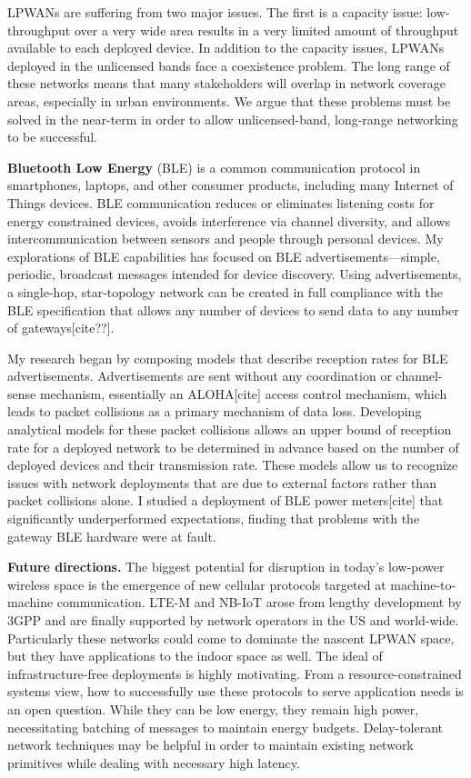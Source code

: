 \documentclass[12pt]{article} %
\begin{document}
LPWANs are suffering from two major issues. The first is a capacity issue:
low-throughput over a very wide area results in a very limited amount of
throughput available to each deployed device. In addition to the capacity
issues, LPWANs deployed in the unlicensed bands face a coexistence problem. The
long range of these networks means that many stakeholders will overlap in
network coverage areas, especially in urban environments. We argue that these
problems must be solved in the near-term in order to allow unlicensed-band,
long-range networking to be successful.

\textbf{Bluetooth Low Energy} (BLE) is a common communication protocol in smartphones,
laptops, and other consumer products, including many Internet of Things
devices. BLE communication reduces or eliminates listening costs for energy
constrained devices, avoids interference via channel diversity, and allows
intercommunication between sensors and people through personal devices. My
explorations of BLE capabilities has focused on BLE advertisements—simple,
periodic, broadcast messages intended for device discovery. Using
advertisements, a single-hop, star-topology network can be created in full
compliance with the BLE specification that allows any number of devices to send
data to any number of gateways[cite??].

My research began by composing models that describe reception rates for BLE
advertisements. Advertisements are sent without any coordination or
channel-sense mechanism, essentially an ALOHA[cite] access control mechanism,
which leads to packet collisions as a primary mechanism of data loss.
Developing analytical models for these packet collisions allows an upper bound
of reception rate for a deployed network to be determined in advance based on
the number of deployed devices and their transmission rate. These models allow
us to recognize issues with network deployments that are due to external
factors rather than packet collisions alone. I studied a deployment of BLE
power meters[cite] that significantly underperformed expectations, finding that
problems with the gateway BLE hardware were at fault.

\textbf{Future directions.} The biggest potential for disruption in today's low-power
wireless space is the emergence of new cellular protocols targeted at
machine-to-machine communication. LTE-M and NB-IoT arose from lengthy
development by 3GPP and are finally supported by network operators in the US
and world-wide. Particularly these networks could come to dominate the nascent
LPWAN space, but they have applications to the indoor space as well. The ideal
of infrastructure-free deployments is highly motivating. From a
resource-constrained systems view, how to successfully use these protocols to
serve application needs is an open question. While they can be low energy, they
remain high power, necessitating batching of messages to maintain energy
budgets. Delay-tolerant network techniques may be helpful in order to maintain
existing network primitives while dealing with necessary high latency.
\end{document}
